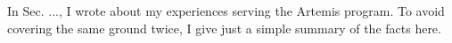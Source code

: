 \documentclass[../../../main.tex]{subfiles}
\begin{document}
\label{sec:cec_artemis}

In Sec. ..., I wrote about my experiences serving the Artemis program.  To avoid covering the same ground twice, I give just a simple summary of the facts here.
\end{document}
